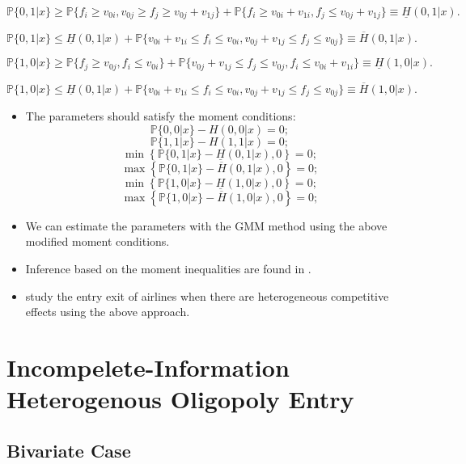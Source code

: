 \documentclass[
]{book}
\providecommand{\tightlist}{%
  \setlength{\itemsep}{0pt}\setlength{\parskip}{0pt}}
\begin{document}
\[
\mathbb{P}\{0, 1|x\} \ge \mathbb{P}\{f_{i} \ge v_{0i}, v_{0j} \ge f_{j} \ge v_{0j} + v_{1j}\} + \mathbb{P}\{f_{i} \ge v_{0i} + v_{1i}, f_{j} \le v_{0j} + v_{1j}\} \equiv \underline{H}(0, 1|x).
\]

\[
\mathbb{P}\{0, 1|x\} \le \underline{H}(0, 1|x) + \mathbb{P}\{v_{0i} + v_{1i} \le f_{i} \le v_{0i}, v_{0j} + v_{1j} \le f_{j} \le v_{0j}\} \equiv \overline{H}(0, 1|x).
\]

\[
\mathbb{P}\{1, 0|x\} \ge \mathbb{P}\{f_{j} \ge v_{0j}, f_{i} \le v_{0i}\} + \mathbb{P}\{ v_{0j} + v_{1j} \le f_{j} \le v_{0j}, f_{i} \le v_{0i} + v_{1i}\} \equiv \underline{H}(1, 0|x).
\]

\[
\mathbb{P}\{1, 0|x\} \le \underline{H}(0, 1|x) + \mathbb{P}\{v_{0i} + v_{1i} \le f_{i} \le v_{0i}, v_{0j} + v_{1j} \le f_{j} \le v_{0j}\} \equiv \overline{H}(1, 0|x).
\]

\begin{itemize}
\tightlist
\item
  The parameters should satisfy the moment conditions:
  \[
  \mathbb{P}\{0, 0|x\} - H(0, 0|x) = 0;
  \]
  \[
  \mathbb{P}\{1, 1|x\} - H(1, 1|x) = 0;
  \]
  \[
  \min\left\{\mathbb{P}\{0, 1|x\} - \underline{H}(0, 1|x), 0\right\} = 0;
  \]
  \[
  \max\left\{\mathbb{P}\{0, 1|x\} - \overline{H}(0, 1|x), 0\right\} = 0;
  \]
  \[
  \min\left\{\mathbb{P}\{1, 0|x\} - \underline{H}(1, 0|x), 0\right\} = 0;
  \]
  \[
  \max\left\{\mathbb{P}\{1, 0|x\} - \overline{H}(1, 0|x), 0\right\} = 0;
  \]
\item
  We can estimate the parameters with the GMM method using the above modified moment conditions.
\item
  Inference based on the moment inequalities are found in \citet{andrewsInferenceParametersDefined2010}.
\item
  \citet{cilibertoMarketStructureMultiple2009} study the entry exit of airlines when there are heterogeneous competitive effects using the above approach.
\end{itemize}

\hypertarget{incompelete-information-heterogenous-oligopoly-entry}{%
\section{Incompelete-Information Heterogenous Oligopoly Entry}\label{incompelete-information-heterogenous-oligopoly-entry}}

\hypertarget{bivariate-case}{%
\subsection{Bivariate Case}\label{bivariate-case}}
\end{document}
